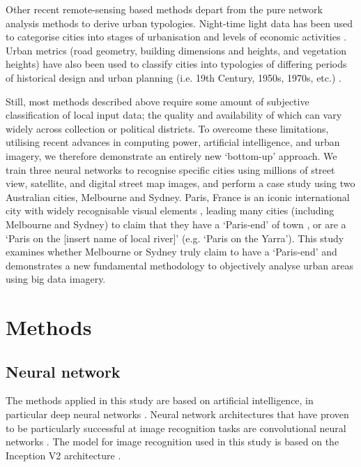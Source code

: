 \documentclass[10pt,letterpaper,hidelinks]{article}
\begin{document}
Other recent remote-sensing based methods depart from the pure network analysis methods to derive urban typologies. Night-time light data has been used to categorise cities into stages of urbanisation and levels of economic activities \cite{Zhang2013}. Urban metrics (road geometry, building dimensions and heights, and vegetation heights) have also been used to classify cities into typologies of differing periods of historical design and urban planning (i.e. 19th Century, 1950s, 1970s, etc.) \cite{Hermosilla2014}.

Still, most methods described above require some amount of subjective classification of local input data; the quality and availability of which can vary widely across collection or political districts. To overcome these limitations, utilising recent advances in computing power, artificial intelligence, and urban imagery, we therefore demonstrate an entirely new `bottom-up' approach. We train three neural networks to recognise specific cities using millions of street view, satellite, and digital street map images, and perform a case study using two Australian cities, Melbourne and Sydney. Paris, France is an iconic international city \cite{Anholt2006} with widely recognisable visual elements \cite{Doersch2012}, leading many cities (including Melbourne and Sydney) to claim that they have a `Paris-end' of town \cite{Williams2010}, or are a `Paris on the [insert name of local river]' \cite{Wilden2013} (e.g. `Paris on the Yarra'). This study examines whether Melbourne or Sydney truly claim to have a `Paris-end' and demonstrates a new fundamental methodology to objectively analyse urban areas using big data imagery.

\section*{Methods}\label{sec:methods}
\subsection*{Neural network}\label{sec:methods1}

The methods applied in this study are based on artificial intelligence, in particular deep neural networks \cite{Bishop1995,Samarasinghe2016,Graupe2013}. Neural network architectures that have proven to be particularly successful at image recognition tasks are convolutional neural networks \cite{Schmidhuber2015}. The model for image recognition used in this study is based on the Inception V2 architecture \cite{Szegedy2015,Ioffe2015}. 
\end{document}
